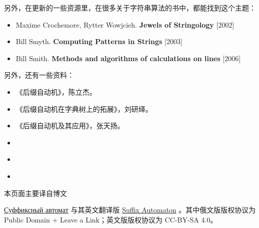 另外，在更新的一些资源里，在很多关于字符串算法的书中，都能找到这个主题：

\begin{itemize}
\item Maxime Crochemore, Rytter Wowjcieh. \textbf{Jewels of Stringology} [2002]
\item Bill Smyth. \textbf{Computing Patterns in Strings} [2003]
\item Bill Smith. \textbf{Methods and algorithms of calculations on lines} [2006]
\end{itemize}

另外，还有一些资料：

\begin{itemize}
\item 《后缀自动机》，陈立杰。
\item 《后缀自动机在字典树上的拓展》，刘研绎。
\item 《后缀自动机及其应用》，张天扬。
\item \href{https://www.cnblogs.com/zinthos/p/3899679.html}{}
\item \href{https://codeforces.com/blog/entry/20861}{}
\item \href{https://zhuanlan.zhihu.com/p/25948077}{}
\end{itemize}

\hr

本页面主要译自博文

\href{http://e-maxx.ru/algo/suffix_automata}{Суффиксный автомат} 与其英文翻译版 \href{https://cp-algorithms.com/string/suffix-automaton.html}{Suffix Automaton} 。其中俄文版版权协议为 Public Domain + Leave a Link；英文版版权协议为 CC-BY-SA 4.0。
